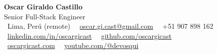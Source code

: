 \documentclass[11pt,letterpaper]{article}
\begin{document}
\raggedright

\begin{center}
  {\Huge\bfseries\color{titleStrong} Oscar Giraldo Castillo}\\[2pt]
  {\large Senior Full-Stack Engineer}\\[4pt]
  {\footnotesize\faMapMarker*}\ Lima, Perú (remote) \textbar\
  {\footnotesize\faEnvelope}\ \href{mailto:oscar.gi.cast@gmail.com}{oscar.gi.cast@gmail.com} \textbar\
  {\footnotesize\faPhone*}\ +51 907 898 162 \\
  {\footnotesize\faLinkedin}\ \href{https://linkedin.com/in/oscargicast}{linkedin.com/in/oscargicast} \textbar\
  {\footnotesize\faGithub}\ \href{https://github.com/oscargicast}{github.com/oscargicast} \\
  {\footnotesize\faGlobe}\ \href{https://oscargicast.com}{oscargicast.com} \textbar\
  {\footnotesize\faYoutube}\ \href{https://www.youtube.com/@devosqui}{youtube.com/@devosqui}
\end{center}









\end{document}
